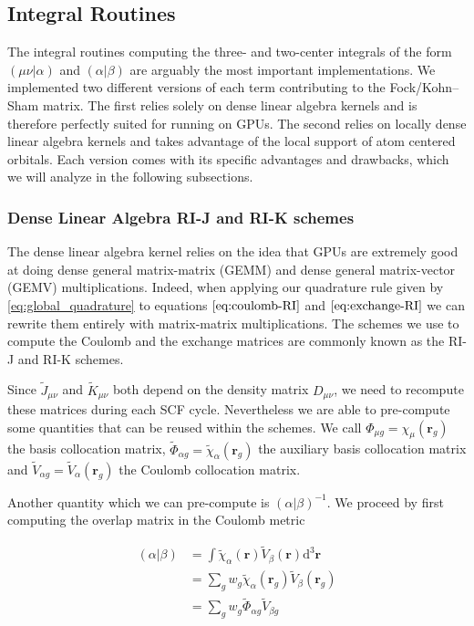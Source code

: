 \documentclass{article}
\begin{document}
\subsection{Integral Routines}\label{subsec:integral_routines}

The integral routines computing the three- and two-center integrals of
the form $(\mu \nu|\alpha)$ and $(\alpha | \beta )$ are arguably
the most important implementations. We implemented two different
versions of each term contributing to the
Fock/Kohn--Sham matrix. The first relies
solely on dense linear algebra kernels and is therefore perfectly suited for
running on GPUs. The second relies on locally dense linear algebra
kernels and takes advantage of the local support of atom centered
orbitals. Each version comes with its specific advantages and
drawbacks, which we will analyze in the following subsections.

\subsubsection{Dense Linear Algebra RI-J and RI-K
schemes}\label{subsubsec:dense_la_rij_rik}

The dense linear algebra kernel relies on the idea that GPUs are
extremely good at doing dense general matrix-matrix (GEMM) and dense
general matrix-vector (GEMV) multiplications. Indeed, when applying
our quadrature rule given by \eqref{eq:global_quadrature} to
equations $\eqref{eq:coulomb-RI}$ and $\eqref{eq:exchange-RI}$ we can
rewrite them entirely with matrix-matrix multiplications. The schemes
we use to compute the Coulomb and the exchange matrices are commonly
known as the RI-J and RI-K schemes.

Since $\tilde J_{\mu \nu}$ and $\tilde K_{\mu \nu}$ both depend on
the density matrix $D_{\mu \nu }$, we need to recompute these
matrices during each SCF cycle. Nevertheless we are able to
pre-compute some quantities that can be reused within the schemes. We call
$\Phi_{\mu g} = \chi_\mu(\mathbf r_g)$ the basis collocation matrix,
$\tilde \Phi_{\alpha g} = \tilde \chi_\alpha(\mathbf r_g)$ the
auxiliary basis collocation matrix and
$\tilde V_{\alpha g} = \tilde V_\alpha(\mathbf r_g)$ the Coulomb
collocation matrix.

Another quantity which we can pre-compute is \( (\alpha | \beta )
^{-1} \). We proceed by first computing the overlap matrix in the
Coulomb metric

\begin{align}
  (\alpha | \beta )
  &= \int \tilde \chi _ {\alpha }(\mathbf r)
  \tilde{V}_\beta(\mathbf r)\mathrm d^3\mathbf r \\
  &= \sum_g w_g \tilde \chi _ {\alpha }(\mathbf r_g)
  \tilde{V}_\beta(\mathbf r_g) \\
  &= \sum_g w_g \tilde \Phi_{\alpha g}
  \tilde{V}_{\beta g}
\end{align}
\end{document}
